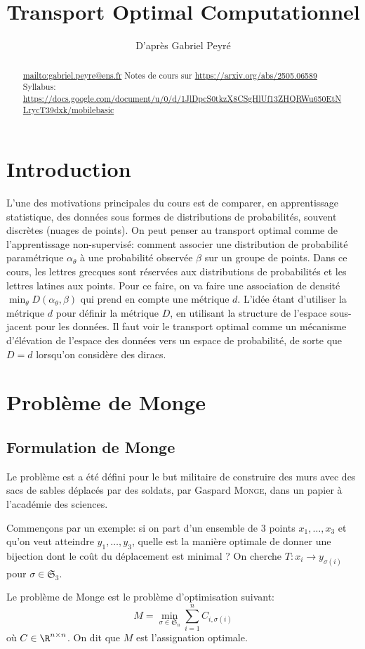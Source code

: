 \documentclass[info, math, french]{mpb-cours}
\title{Transport Optimal Computationnel}
\author{D'après Gabriel Peyré}
\begin{document}
\bettertitle
\begin{abstract}
	\url{mailto:gabriel.peyre@ens.fr}
	Notes de cours sur \url{https://arxiv.org/abs/2505.06589}
	Syllabus: \url{https://docs.google.com/document/u/0/d/1JlDpcS0tkzX8CSgHlUf13ZHQRWu650EtNLrycT39dxk/mobilebasic}
\end{abstract}

\section*{Introduction}
L'une des motivations principales du cours est de comparer, en apprentissage statistique,
des données sous formes de distributions de probabilités, souvent discrètes (nuages de points).
On peut penser au transport optimal comme de l'apprentissage non-supervisé: comment associer une
distribution de probabilité paramétrique $\alpha_{\theta}$ à une probabilité observée $\beta$ sur un groupe de points.
Dans ce cours, les lettres grecques sont réservées aux distributions de probabilités et les lettres latines
aux points.
Pour ce faire, on va faire une association de densité $\min_{\theta} D(\alpha_{\theta}, \beta)$ qui
prend en compte une métrique $d$.
L'idée étant d'utiliser la métrique $d$ pour définir la métrique $D$, en utilisant la structure
de l'espace sous-jacent pour les données.
Il faut voir le transport optimal comme un mécanisme d'élévation de l'espace des données vers un espace
de probabilité, de sorte que $D = d$ lorsqu'on considère des diracs.


\section{Problème de Monge}
\subsection{Formulation de Monge}
Le problème est a été défini pour le but militaire de construire des murs avec des sacs de sables déplacés
par des soldats, par Gaspard \textsc{Monge}, dans un papier à l'académie des sciences.

Commençons par un exemple: si on part d'un ensemble de $3$ points $x_{1}, \ldots, x_{3}$ et qu'on veut atteindre $y_{1}, \ldots, y_{3}$, quelle est la manière optimale de donner une bijection dont le coût du
déplacement est minimal ?
On cherche $T: x_{i} \to y_{\sigma(i)}$ pour $\sigma \in \mathfrak{S}_{3}$.

\begin{definition}
	Le problème de Monge est le problème d'optimisation suivant:
	\begin{equation}
		M = \min_{\sigma \in \mathfrak{S}_{n}}\sum_{i = 1}^{n} C_{i, \sigma(i)} \tag{Monge}\label{eq:M}
	\end{equation}
	où $C \in \R^{n \times n}$. On dit que $M$ est l'assignation optimale.
\end{definition}
\end{document}

